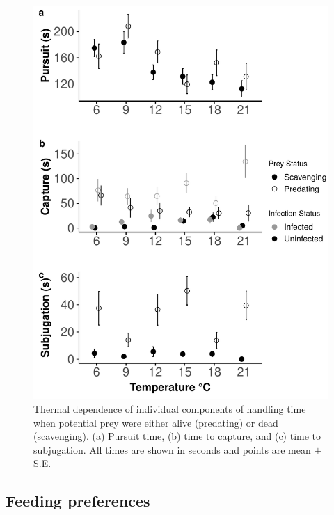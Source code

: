 \begin{figure}[H]
    \centering
    \includegraphics[keepaspectratio,width=\textwidth]{figures/ch4/feedtime_1.pdf}
  \caption [Thermal dependence of components of handling time when potential prey were either mobile or sessile]{Thermal dependence of individual components of handling time when potential prey were either alive (predating) or dead (scavenging). (a) Pursuit time, (b) time to capture, and (c) time to subjugation. All times are shown in seconds and points are mean  $\pm$ S.E.} 
    \label{fig:feedtime}
\end{figure}

\subsection{Feeding preferences}

